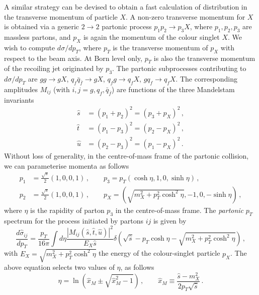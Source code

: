 \documentclass[12pt]{article}
\begin{document}
A similar strategy can be devised to obtain a fast calculation of
distribution in the transverse momentum of particle $X$. A non-zero
transverse momentum for $X$ is obtained via a generic $2\to 2$
partonic process $p_1 p_2 \to p_3 X$, where $p_1,p_2,p_3$ are massless
partons, and $p_X$ is again the momentum of the colour singlet $X$. We
wish to compute $d\sigma/dp_T$, where $p_T$ is the transverse momentum
of $p_X$ with respect to the beam axis. At Born level only, $p_T$ is
also the transverse momentum of the recoiling jet originated by
$p_3$. The partonic subprocesses contributing to $d\sigma/dp_T$ are
$gg\to g X$, $q_f \bar q_{\bar f} \to g X$, $q_f g\to q_f X$,
$gq_f \to q_fX$. The corresponding amplitudes $M_{ij}$ (with
$i,j=g,q_f,\bar q_{\bar f}$) are functions of the three Mandelstam
invariants
\begin{equation}
  \label{eq:Mandelstam}
  \begin{split}
  \hat s & = (p_1+p_2)^2 = (p_3+p_X)^2 \,,\\
  \hat t & = (p_1-p_3)^2 = (p_2-p_X)^2 \,,\\
  \hat u & = (p_2-p_3)^2 = (p_1-p_X)^2 \,.
  \end{split}
\end{equation}
Without loss of generality, in the centre-of-mass frame of the
partonic collision, we can parameterise momenta as follows
\begin{equation}
  \label{eq:momenta}
  \begin{split}
  p_1&=\frac{\sqrt s}{2}(1,0,0,1)\,,\qquad p_3 = p_T(\cosh\eta,1,0,\sinh\eta)\,,\\
  p_2&=\frac{\sqrt s}{2}(1,0,0,1)\,,\qquad p_X = (\sqrt{m_X^2+p^2_T\cosh^2\eta},-1,0,-\sinh\eta)\,,
  \end{split}
\end{equation}
where $\eta$ is the rapidity of parton $p_3$ in the
centre-of-mass frame. The {\em partonic} $p_T$ spectrum for the
process initiated by partons $ij$ is given by
\begin{equation}
  \label{eq:partonic-pt}
  \frac{d\hat \sigma_{ij}}{dp_T} = \frac{p_T}{16\pi}\int d\eta \frac{|M_{ij}(\hat s,\hat t,\hat u)|^2}{E_X \hat s} \delta\left(\sqrt{\hat s} - p_T\cosh\eta-\sqrt{m_X^2+p^2_T\cosh^2\eta}\right)\,, 
\end{equation}
with $E_X=\sqrt{m_X^2+p^2_T\cosh^2\eta}$ the energy of the colour-singlet
particle $p_X$.  The above equation selects two values of $\eta$, as
follows
\begin{equation}
\label{eq:eta-values}
  \eta = \ln\left(\hat x_M \pm \sqrt{\hat x_M^2-1}\right)\,,\qquad \hat x_M\equiv\frac{\hat s-m_X^2}{2 p_T \sqrt{\hat s} }\,.
\end{equation}
\end{document}
